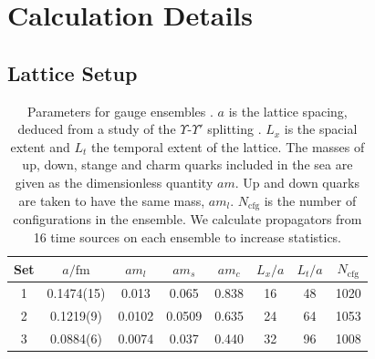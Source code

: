\documentclass[a4paper,10pt]{article}
\numberwithin{equation}{section}
\begin{document}

\section{Calculation Details}
\label{sec:deets}

\subsection{Lattice Setup}


\begin{table}
\begin{center}
 \begin{tabular}{||c c c c c c c c||}
 \hline
 Set & $a/\text{fm}$ & $am_l$ & $am_s$ & $am_c$ & $L_x/a$ & $L_t/a$ & $N_{\text{cfg}}$ \\ [0.5ex] 
 \hline\hline
 1 & 0.1474(15) & 0.013 & 0.065 & 0.838 & 16 & 48 & 1020 \\ [1ex]
 2 & 0.1219(9) & 0.0102 & 0.0509 & 0.635 & 24 & 64 & 1053 \\ [1ex]
 3 & 0.0884(6) & 0.0074 & 0.037 & 0.440 & 32 & 96 & 1008 \\ [1ex]
 \hline
\end{tabular}
\caption{Parameters for gauge ensembles \cite{Bazavov:2012xda}.
$a$ is the lattice spacing, deduced from a study of the
$\Upsilon$-$\Upsilon'$ splitting \cite{Dowdall:2011wh}. $L_x$ is the spacial extent and $L_t$ the
temporal extent of the lattice. The masses of up, down, stange and
charm quarks included in the sea are given as the dimensionless quantity $am$.
Up and down quarks are taken to have the same mass, $am_l$. $N_{\text{cfg}}$ is the number of configurations in the ensemble. We calculate propagators from 16 time sources on each ensemble to increase statistics. \label{table:ensembles}}
\end{center}
\end{table}
\end{document}

